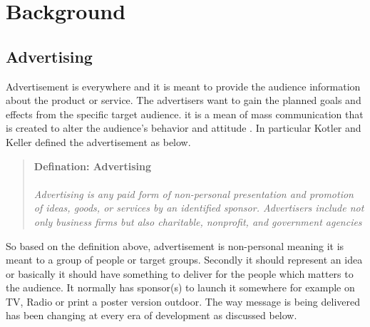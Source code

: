 
\chapter{Background} %

\label{Chapter2} %
\newpage

\section{Advertising}

Advertisement is everywhere and it is meant to provide the audience information about the product or service. The advertisers want to gain the planned goals and effects from the specific target audience. it is a mean of mass communication that is created to alter the audience’s behavior and attitude \cite{advertisementdef}. In particular Kotler and Keller \cite{ad_def} defined the advertisement as below.

\begin{snugshade}
\begin{quote}\textbf{Defination: Advertising }\\ \\ \emph{Advertising is any paid form of non-personal presentation and promotion of ideas, goods, or services by an identified sponsor. Advertisers include not only business firms but also charitable, nonprofit, and government agencies}\end{quote}
\end{snugshade}

So based on the definition above, advertisement is non-personal meaning it is meant to a group of people or target groups. Secondly it should represent an idea or basically it should have something to deliver for the people which matters to the audience. It normally has sponsor(s) to launch it somewhere for example on TV, Radio or print a poster version outdoor. The way message is being delivered has been changing at every era of development as discussed below.




